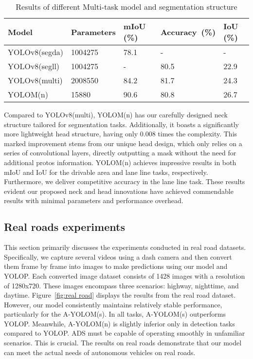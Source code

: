\documentclass[lettersize,journal]{IEEEtran}
\begin{document}
{\begin{table}[!h]
    \centering
    \caption{Results of different Multi-task model and segmentation structure}
    \label{tab:segmentation_comparison}
    \begin{tabularx}{\linewidth}{YYYYY}
    \toprule
    Model & Parameters & mIoU (\%) & \mbox{Accuracy (\%)} & IoU (\%) \\
    \midrule
    YOLOv8(segda) & 1004275 & 78.1 & - & - \\
    YOLOv8(segll) & 1004275 & - & 80.5 & 22.9 \\
    YOLOv8(multi) & 2008550 & 84.2 & 81.7 & 24.3 \\
    YOLOM(n) & 15880 & 90.6 & 80.8 & 26.7 \\
    \bottomrule
    \end{tabularx}
\end{table}

Compared to YOLOv8(multi), YOLOM(n) has our carefully designed neck structure tailored for segmentation tasks. Additionally, it boasts a significantly more lightweight head structure, having only 0.008 times the complexity. This marked improvement stems from our unique head design, which only relies on a series of convolutional layers, directly outputting a mask without the need for additional protos information. YOLOM(n) achieves impressive results in both mIoU and IoU for the drivable area and lane line tasks, respectively. Furthermore, we deliver competitive accuracy in the lane line task. These results evident our proposed neck and head innovations have achieved commendable results with minimal parameters and performance overhead.


\subsection{Real roads experiments}
\label{subsec: Real roads experiments}

This section primarily discusses the experiments conducted in real road datasets. Specifically, we capture several videos using a dash camera and then convert them frame by frame into images to make predictions using our model and YOLOP. Each converted image dataset consists of 1428 images with a resolution of 1280x720. These images encompass three scenarios: highway, nighttime, and daytime. Figure~\ref{fig:real road} displays the results from the real road dataset. However, our model consistently maintains relatively stable performance, particularly for the A-YOLOM(s). In all tasks, A-YOLOM(s) outperforms YOLOP. Meanwhile, A-YOLOM(n) is slightly inferior only in detection tasks compared to YOLOP. ADS must be capable of operating smoothly in unfamiliar scenarios. This is crucial. The results on real roads demonstrate that our model can meet the actual needs of autonomous vehicles on real roads.





}
\end{document}
